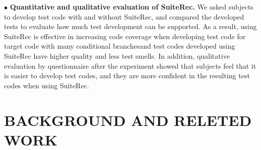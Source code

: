 \documentclass[conference]{IEEEtran}
\begin{document}
\noindent
$\bullet$ \textbf{Quantitative and qualitative evaluation of SuiteRec.} We asked subjects to develop test code with and without SuiteRec, and compared the developed tests to evaluate how much test development can be supported. As a result, using SuiteRec is effective in increasing code coverage when developing test code for target code with many conditional branchesand test codes developed using SuiteRec have higher quality and less test smells. In addition, qualitative evaluation by questionnaire after the experiment showed that subjects feel that it is easier to develop test codes, and they are more confident in the resulting test codes when using SuiteRec.

\section{BACKGROUND AND RELETED WORK}
\end{document}

